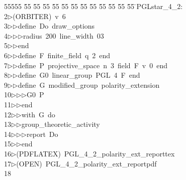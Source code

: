 %
%
\begin{tabbing}
55555 \= 55 \= 55 \= 55 \= 55 \= 55 \= 55 \= 55 \= 55 \= 55 \= 55 \= 55 \= 55 \= \>PGLstar\_4\_2:\\[0pt]
2\>$\triangleright$\>(ORBITER)\ v\ 6\ \\[0pt]
3\>$\triangleright$\>$\triangleright$\>define\ Do\ draw\_options\ \\[0pt]
4\>$\triangleright$\>$\triangleright$\>$\triangleright$\>radius\ 200\ line\_width\ 03\ \\[0pt]
5\>$\triangleright$\>$\triangleright$\>end\ \\[0pt]
6\>$\triangleright$\>$\triangleright$\>define\ F\ finite\_field\ q\ 2\ end\ \\[0pt]
7\>$\triangleright$\>$\triangleright$\>define\ P\ projective\_space\ n\ 3\ field\ F\ v\ 0\ end\ \\[0pt]
8\>$\triangleright$\>$\triangleright$\>define\ G0\ linear\_group\ PGL\ 4\ F\ end\ \\[0pt]
9\>$\triangleright$\>$\triangleright$\>define\ G\ modified\_group\ polarity\_extension\ \\[0pt]
10\>$\triangleright$\>$\triangleright$\>$\triangleright$\>G0\ P\ \\[0pt]
11\>$\triangleright$\>$\triangleright$\>end\ \\[0pt]
12\>$\triangleright$\>$\triangleright$\>with\ G\ do\ \\[0pt]
13\>$\triangleright$\>$\triangleright$\>group\_theoretic\_activity\ \\[0pt]
14\>$\triangleright$\>$\triangleright$\>$\triangleright$\>report\ Do\ \\[0pt]
15\>$\triangleright$\>$\triangleright$\>end\\[0pt]
16\>$\triangleright$\>(PDFLATEX)\ PGL\_4\_2\_polarity\_ext\_reporttex\\[0pt]
17\>$\triangleright$\>(OPEN)\ PGL\_4\_2\_polarity\_ext\_reportpdf\\[0pt]
18\>\end{tabbing}
